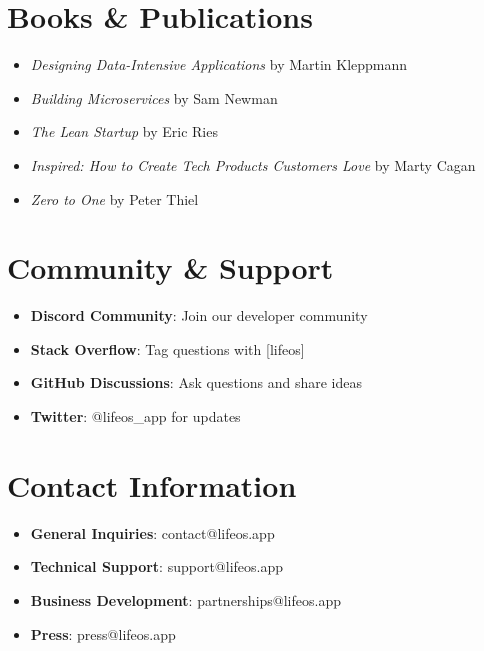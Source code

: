 \section{Books \& Publications}

\begin{itemize}
    \item \textit{Designing Data-Intensive Applications} by Martin Kleppmann
    \item \textit{Building Microservices} by Sam Newman
    \item \textit{The Lean Startup} by Eric Ries
    \item \textit{Inspired: How to Create Tech Products Customers Love} by Marty Cagan
    \item \textit{Zero to One} by Peter Thiel
\end{itemize}

\section{Community \& Support}

\begin{itemize}
    \item \textbf{Discord Community}: Join our developer community
    \item \textbf{Stack Overflow}: Tag questions with [lifeos]
    \item \textbf{GitHub Discussions}: Ask questions and share ideas
    \item \textbf{Twitter}: @lifeos\_app for updates
\end{itemize}

\section{Contact Information}

\begin{itemize}
    \item \textbf{General Inquiries}: contact@lifeos.app
    \item \textbf{Technical Support}: support@lifeos.app
    \item \textbf{Business Development}: partnerships@lifeos.app
    \item \textbf{Press}: press@lifeos.app
\end{itemize}
